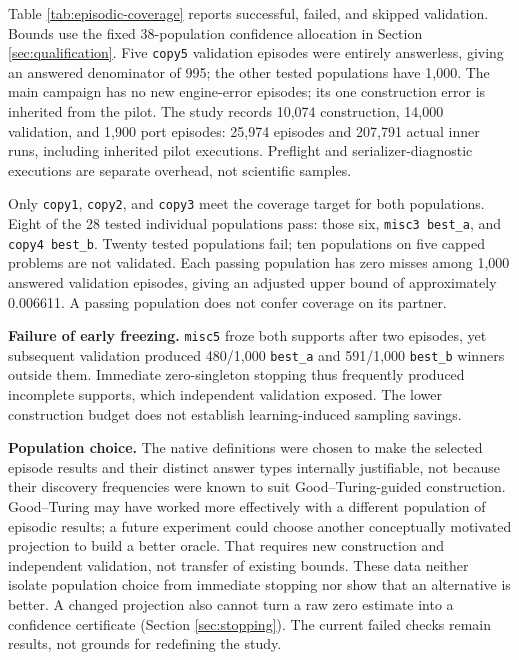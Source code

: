\documentclass[10pt,letterpaper]{article}
\begin{document}
Table \ref{tab:episodic-coverage} reports successful, failed, and skipped validation.
Bounds use the fixed 38-population confidence allocation in Section
\ref{sec:qualification}. Five \texttt{copy5} validation episodes were entirely answerless,
giving an answered denominator of 995; the other tested populations have 1,000. The main
campaign has no new engine-error episodes; its one construction error is inherited from
the pilot. The study records 10,074 construction, 14,000 validation, and 1,900 port
episodes: 25,974 episodes and 207,791 actual inner runs, including inherited pilot
executions. Preflight and serializer-diagnostic executions are separate overhead, not
scientific samples.



Only \texttt{copy1}, \texttt{copy2}, and \texttt{copy3} meet the coverage target for both
populations. Eight of the 28 tested individual populations pass: those six,
\texttt{misc3\ best\_a}, and \texttt{copy4\ best\_b}. Twenty tested populations fail; ten
populations on five capped problems are not validated. Each passing population has zero
misses among 1,000 answered validation episodes, giving an adjusted upper bound of
approximately 0.006611. A passing population does not confer coverage on its partner.

\textbf{Failure of early freezing.} \texttt{misc5} froze both supports after two episodes,
yet subsequent validation produced 480/1,000 \texttt{best\_a} and 591/1,000
\texttt{best\_b} winners outside them. Immediate zero-singleton stopping thus frequently
produced incomplete supports, which independent validation exposed. The lower construction
budget does not establish learning-induced sampling savings.

\textbf{Population choice.} The native definitions were chosen to make the selected
episode results and their distinct answer types internally justifiable, not because their
discovery frequencies were known to suit Good--Turing-guided construction. Good--Turing
may have worked more effectively with a different population of episodic results; a future
experiment could choose another conceptually motivated projection to build a better
oracle. That requires new construction and independent validation, not transfer of
existing bounds. These data neither isolate population choice from immediate stopping nor
show that an alternative is better. A changed projection also cannot turn a raw zero
estimate into a confidence certificate (Section \ref{sec:stopping}). The current failed
checks remain results, not grounds for redefining the study.
\end{document}
